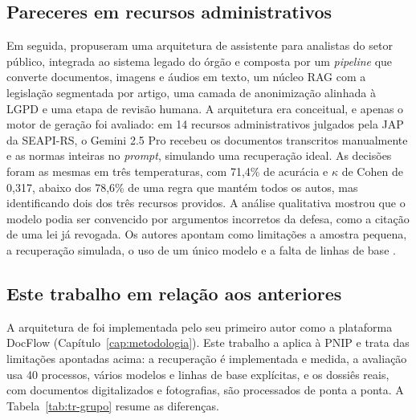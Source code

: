 \subsection{Pareceres em recursos administrativos}

Em seguida,  propuseram uma arquitetura de assistente para analistas do setor público, integrada ao sistema legado do órgão e composta por um \textit{pipeline} que converte documentos, imagens e áudios em texto, um núcleo RAG com a legislação segmentada por artigo, uma camada de anonimização alinhada à LGPD e uma etapa de revisão humana. A arquitetura era conceitual, e apenas o motor de geração foi avaliado: em 14 recursos administrativos julgados pela JAP da SEAPI-RS, o Gemini 2.5 Pro recebeu os documentos transcritos manualmente e as normas inteiras no \textit{prompt}, simulando uma recuperação ideal. As decisões foram as mesmas em três temperaturas, com 71,4\% de acurácia e $\kappa$ de Cohen de 0,317, abaixo dos 78,6\% de uma regra que mantém todos os autos, mas identificando dois dos três recursos providos. A análise qualitativa mostrou que o modelo podia ser convencido por argumentos incorretos da defesa, como a citação de uma lei já revogada. Os autores apontam como limitações a amostra pequena, a recuperação simulada, o uso de um único modelo e a falta de linhas de base \cite{Montero2026}.

\subsection{Este trabalho em relação aos anteriores}

A arquitetura de  foi implementada pelo seu primeiro autor como a plataforma DocFlow (Capítulo~\ref{cap:metodologia}). Este trabalho a aplica à PNIP e trata das limitações apontadas acima: a recuperação é implementada e medida, a avaliação usa 40 processos, vários modelos e linhas de base explícitas, e os dossiês reais, com documentos digitalizados e fotografias, são processados de ponta a ponta. A Tabela~\ref{tab:tr-grupo} resume as diferenças.

